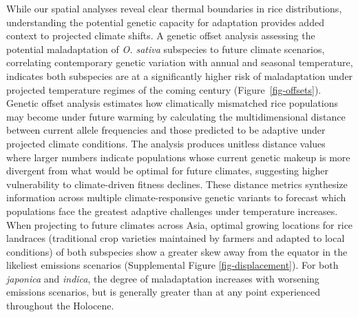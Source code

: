 \documentclass[
  letterpaper,
  DIV=11,
  numbers=noendperiod]{scrartcl}
\begin{document}
While our spatial analyses reveal clear thermal boundaries in rice
distributions, understanding the potential genetic capacity for
adaptation provides added context to projected climate shifts. A genetic
offset analysis assessing the potential maladaptation of \emph{O.
sativa} subspecies to future climate scenarios, correlating contemporary
genetic variation with annual and seasonal temperature, indicates both
subspecies are at a significantly higher risk of maladaptation under
projected temperature regimes of the coming century
(Figure~\ref{fig-offsets}). Genetic offset analysis estimates how
climatically mismatched rice populations may become under future warming
by calculating the multidimensional distance between current allele
frequencies and those predicted to be adaptive under projected climate
conditions. The analysis produces unitless distance values where larger
numbers indicate populations whose current genetic makeup is more
divergent from what would be optimal for future climates, suggesting
higher vulnerability to climate-driven fitness declines. These distance
metrics synthesize information across multiple climate-responsive
genetic variants to forecast which populations face the greatest
adaptive challenges under temperature increases. When projecting to
future climates across Asia, optimal growing locations for rice
landraces (traditional crop varieties maintained by farmers and adapted
to local conditions) of both subspecies show a greater skew away from
the equator in the likeliest emissions scenarios (Supplemental Figure
\ref{fig-displacement}). For both \emph{japonica} and \emph{indica}, the
degree of maladaptation increases with worsening emissions scenarios,
but is generally greater than at any point experienced throughout the
Holocene.
\end{document}
